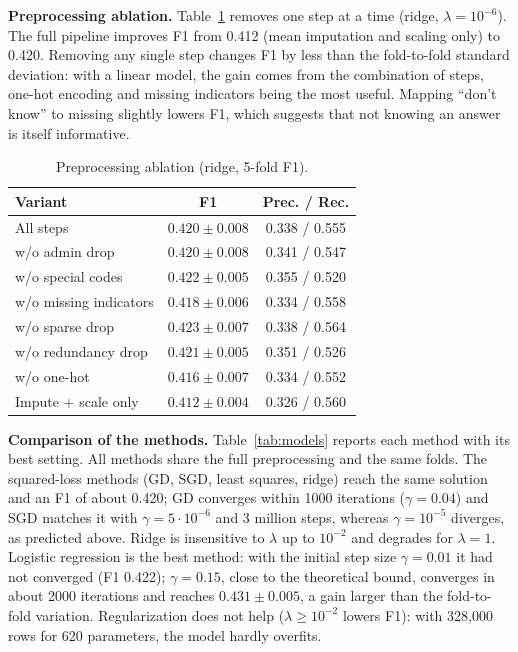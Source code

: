 \documentclass[10pt,conference,compsocconf]{IEEEtran}
\begin{document}
\textbf{Preprocessing ablation.} Table~\ref{tab:ablation} removes one step at
a time (ridge, $\lambda = 10^{-6}$). The full pipeline improves F1 from 0.412
(mean imputation and scaling only) to 0.420. Removing any single step changes
F1 by less than the fold-to-fold standard deviation: with a linear model, the
gain comes from the combination of steps, one-hot encoding and missing
indicators being the most useful. Mapping ``don't know'' to missing slightly
lowers F1, which suggests that not knowing an answer is itself informative.

\begin{table}[htbp]
  \centering
  \caption{Preprocessing ablation (ridge, 5-fold F1).}
  \label{tab:ablation}
  \small\setlength{\tabcolsep}{4pt}
  \begin{tabular}{lcc}
    \toprule
    Variant & F1 & Prec. / Rec. \\
    \midrule
    All steps & $0.420 \pm 0.008$ & 0.338 / 0.555 \\
    \quad w/o admin drop & $0.420 \pm 0.008$ & 0.341 / 0.547 \\
    \quad w/o special codes & $0.422 \pm 0.005$ & 0.355 / 0.520 \\
    \quad w/o missing indicators & $0.418 \pm 0.006$ & 0.334 / 0.558 \\
    \quad w/o sparse drop & $0.423 \pm 0.007$ & 0.338 / 0.564 \\
    \quad w/o redundancy drop & $0.421 \pm 0.005$ & 0.351 / 0.526 \\
    \quad w/o one-hot & $0.416 \pm 0.007$ & 0.334 / 0.552 \\
    Impute + scale only & $0.412 \pm 0.004$ & 0.326 / 0.560 \\
    \bottomrule
  \end{tabular}
\end{table}

\textbf{Comparison of the methods.} Table~\ref{tab:models} reports each
method with its best setting. All methods share the full preprocessing and the
same folds. The squared-loss methods (GD, SGD, least squares, ridge) reach the
same solution and an F1 of about 0.420; GD converges within 1000 iterations
($\gamma = 0.04$) and SGD matches it with $\gamma = 5\cdot 10^{-6}$ and
3 million steps, whereas $\gamma = 10^{-5}$ diverges, as predicted above.
Ridge is insensitive to $\lambda$ up to $10^{-2}$ and degrades for
$\lambda = 1$. Logistic regression is the best method: with the initial step
size $\gamma = 0.01$ it had not converged (F1 0.422); $\gamma = 0.15$,
close to the theoretical bound, converges in about 2000 iterations and reaches
$0.431 \pm 0.005$, a gain larger than the fold-to-fold variation.
Regularization does not help ($\lambda \geq 10^{-2}$ lowers F1): with
328{,}000 rows for 620 parameters, the model hardly overfits.
\end{document}
